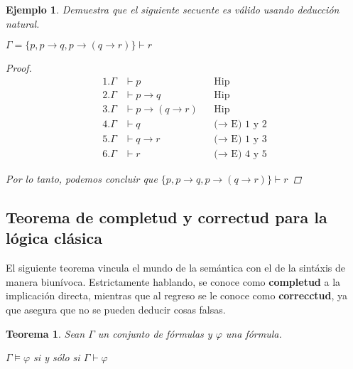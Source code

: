 \documentclass[letterpaper,12pt]{article}
\newtheorem{teo}{Teorema}[]
\newtheorem{ejem}{Ejemplo}[]
\begin{document}
    \newpage
    \begin{ejem}
        Demuestra que el siguiente secuente es válido usando deducción 
        natural.
        \begin{center}
            $\Gamma = \{p, p \rightarrow q,
            p \rightarrow (q \rightarrow r) \} \vdash r$
        \end{center}

        \begin{proof}
            \begin{align*}
                1. \Gamma &\vdash p
                && \text{Hip} \\
                2. \Gamma &\vdash p \rightarrow q
                && \text{Hip} \\
                3. \Gamma &\vdash p \rightarrow (q \rightarrow r)
                && \text{Hip} \\
                4. \Gamma &\vdash q
                && \text{($\rightarrow$ E) 1 y 2} \\
                5. \Gamma &\vdash q \rightarrow r
                && \text{($\rightarrow$ E) 1 y 3} \\
                6. \Gamma &\vdash r
                && \text{($\rightarrow$ E) 4 y 5} 
            \end{align*}

            \justify
            Por lo tanto, podemos concluir que 
            $\{p, p \rightarrow q, p \rightarrow (q \rightarrow r) \} 
            \vdash r$

        \end{proof}
    \end{ejem}

    \subsection{Teorema de completud y correctud para la lógica clásica}
    El siguiente teorema vincula el mundo de la semántica con el de la 
    sintáxis de manera biunívoca. Estrictamente hablando, se conoce como
    \textbf{completud} a la implicación directa, mientras que al regreso 
    se le conoce como \textbf{correcctud}, ya que asegura que no se 
    pueden deducir cosas falsas.
    \begin{teo}
        Sean $\Gamma$ un conjunto de fórmulas y $\varphi$ una fórmula.
        \begin{center}
            $\Gamma \models \varphi$ si y sólo si $\Gamma \vdash \varphi$
        \end{center}
    \end{teo}
\end{document}
